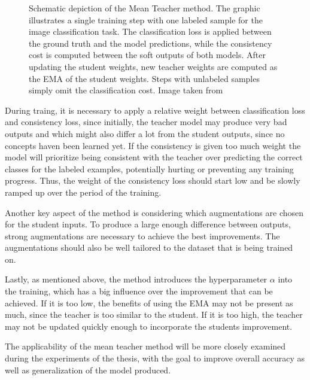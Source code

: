 \begin{figure}[htbp]
   \caption{Schematic depiction of the Mean Teacher method. The graphic illustrates a single training step with one labeled sample for the image classification task. The classification loss is applied between the ground truth and the model predictions, while the consistency cost is computed between the soft outputs of both models. After updating the student weights, new teacher weights are computed as the EMA of the student weights. Steps with unlabeled samples simply omit the classification cost. Image taken from \cite{tarvainenMeanTeachersAre2018}}
   \label{fig:mean_teacher}
\end{figure}

During traing, it is necessary to apply a relative weight between classification loss and consistency loss, since initially, the teacher model may produce very bad outputs and which might also differ a lot from the student outputs, since no concepts haven been learned yet. 
If the consistency is given too much weight the model will prioritize being consistent with the teacher over predicting the correct classes for the labeled examples, potentially hurting or preventing any training progress. 
Thus, the weight of the consistency loss should start low and be slowly ramped up over the period of the training. 

Another key aspect of the method is considering which augmentations are chosen for the student inputs. To produce a large enough difference between outputs, strong augmentations are necessary to achieve the best improvements. The augmentations should also be well tailored to the dataset that is being trained on. 

Lastly, as mentioned above, the method introduces the hyperparameter $\alpha$ into the training, which has a big influence over the improvement that can be achieved. If it is too low, the benefits of using the EMA may not be present as much, since the teacher is too similar to the student. If it is too high, the teacher may not be updated quickly enough to incorporate the students improvement. 

The applicability of the mean teacher method will be more closely examined during the experiments of the thesis, with the goal to improve overall accuracy as well as generalization of the model produced. 